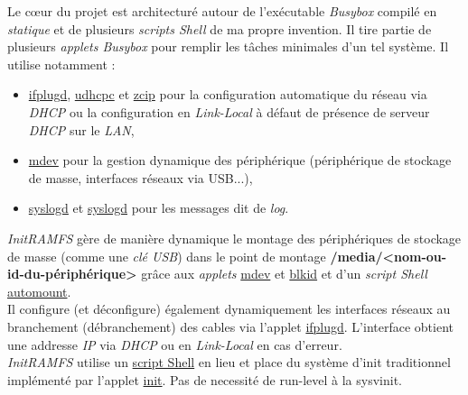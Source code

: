 \documentclass[a4paper]{article}
\begin{document}
Le c\oe{}ur du projet est architecturé autour de l'exécutable \textit{Busybox} compilé en \textit{statique} et de plusieurs \textit{scripts Shell} de ma propre invention. Il tire partie de plusieurs \textit{applets Busybox} pour remplir les tâches minimales d'un tel système. Il utilise notamment :
\begin{itemize}
\item \href{http://www.busybox.net/downloads/BusyBox.html#ifplugd}{ifplugd}, \href{http://www.busybox.net/downloads/BusyBox.html#udhcpc}{udhcpc} et \href{http://www.busybox.net/downloads/BusyBox.html#zcip}{zcip} pour la configuration automatique du réseau via \textit{DHCP} ou la configuration en \textit{Link-Local} à défaut de présence de serveur \textit{DHCP} sur le \textit{LAN},
\item \href{http://www.busybox.net/downloads/BusyBox.html#mdev}{mdev} pour la gestion dynamique des périphérique (périphérique de stockage de masse, interfaces réseaux via USB...),
\item \href{http://www.busybox.net/downloads/BusyBox.html#syslogd}{syslogd} et \href{http://www.busybox.net/downloads/BusyBox.html#klogd}{syslogd} pour les messages dit de \textit{log}.
\end{itemize}

\textit{InitRAMFS} gère de manière dynamique le montage des périphériques de stockage de masse (comme une \textit{clé USB}) dans le point de montage \textbf{/media/<nom-ou-id-du-périphérique>} grâce aux \textit{applets} \href{http://www.busybox.net/downloads/BusyBox.html#mdev}{mdev} et \href{http://www.busybox.net/downloads/BusyBox.html#blkid}{blkid} et d'un \textit{script Shell} \href{https://github.com/gazoo74/initramfs/blob/old-fixes-and-dev-need-study/packages-initramfs/mdev/usr/sbin/automount}{automount}.\\

Il configure (et déconfigure) également dynamiquement les interfaces réseaux au branchement (débranchement) des cables via l'applet \href{http://www.busybox.net/downloads/BusyBox.html#ifplugd}{ifplugd}. L'interface obtient une addresse \textit{IP} via \textit{DHCP} ou en \textit{Link-Local} en cas d'erreur.\\

\textit{InitRAMFS} utilise un \href{https://github.com/gazoo74/initramfs/blob/master/packages-initramfs/ramfs/etc/init}{script Shell} en lieu et place du système d'init traditionnel implémenté par l'applet \href{http://www.busybox.net/downloads/BusyBox.html#init}{init}. Pas de necessité de run-level à la sysvinit.\\
\end{document}
